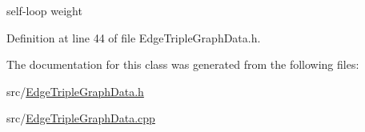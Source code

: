 self-\/loop weight 



Definition at line 44 of file Edge\-Triple\-Graph\-Data.\-h.



The documentation for this class was generated from the following files\-:\begin{DoxyCompactItemize}
\item 
src/\hyperlink{_edge_triple_graph_data_8h}{Edge\-Triple\-Graph\-Data.\-h}\item 
src/\hyperlink{_edge_triple_graph_data_8cpp}{Edge\-Triple\-Graph\-Data.\-cpp}\end{DoxyCompactItemize}
